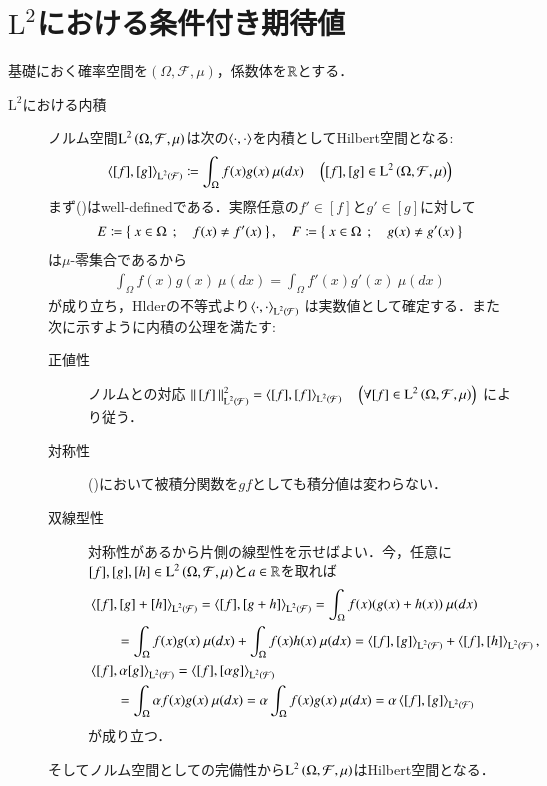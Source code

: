 \section{$\mathrm{L}^2$における条件付き期待値}
	基礎におく確率空間を$(\Omega,\mathcal{F},\mu)$，係数体を$\mathbb{R}$とする．
	
	\begin{description}
	\item[$\mathrm{L}^2$における内積]
		ノルム空間$\operatorname{L}^{2} \left(\Omega,\mathcal{F},\mu\right)$は次の$\inprod<\cdot,\cdot>$を内積としてHilbert空間となる:
		\begin{align}
			\inprod<[f],[g]>_{\Lp{2}{\mathcal{F}}} \coloneqq \int_{\Omega} f(x)g(x)\ \mu(dx) \quad \left( [f],[g] \in \Lp{2}{\Omega,\mathcal{F},\mu} \right)
			\label{eq:L2_inner_product}
		\end{align}
		まず()はwell-definedである．実際任意の$f' \in [f]$と$g' \in [g]$に対して
		\begin{align}
			E \coloneqq \left\{\ x \in \Omega\ \, ; \quad f(x) \neq f'(x)\ \right\}, \quad
			F \coloneqq \left\{\ x \in \Omega\ \, ; \quad g(x) \neq g'(x)\ \right\}
		\end{align}
		は$\mu$-零集合であるから
		\begin{align}
			\int_{\Omega} f(x)g(x)\ \mu(dx) = \int_{\Omega} f'(x)g'(x)\ \mu(dx)
		\end{align}
		が成り立ち，Hlderの不等式より$\inprod<\cdot,\cdot>_{\Lp{2}{\mathcal{F}}}$
		は実数値として確定する．また次に示すように内積の公理を満たす:
		\begin{description}
			\item[正値性] 
				ノルムとの対応
				$\Norm{[f]}{\Lp{2}{\mathcal{F}}}^2 = \inprod<[f],[f]>_{\Lp{2}{\mathcal{F}}} \quad \left(\forall [f] \in \Lp{2}{\Omega,\mathcal{F},\mu} \right)$
				により従う．
			\item[対称性] 
				()において被積分関数を$gf$としても積分値は変わらない．
			\item[双線型性] 
				対称性があるから片側の線型性を示せばよい．今，任意に$[f],[g],[h] \in \operatorname{L}^{2} \left(\Omega,\mathcal{F},\mu\right)$と$a \in \mathbb{R}$を取れば
				\begin{align}
					&\inprod<[f],[g] + [h]>_{\Lp{2}{\mathcal{F}}} 
					= \inprod<[f],[g + h]>_{\Lp{2}{\mathcal{F}}}
					= \int_{\Omega} f(x)(g(x) + h(x))\ \mu(dx) \\
					&\qquad= \int_{\Omega} f(x)g(x)\ \mu(dx) + \int_{\Omega} f(x)h(x)\ \mu(dx)
					= \inprod<[f],[g]>_{\Lp{2}{\mathcal{F}}} + \inprod<[f],[h]>_{\Lp{2}{\mathcal{F}}}, \\
					&\inprod<[f],\alpha [g]>_{\Lp{2}{\mathcal{F}}} 
						= \inprod<[f],[\alpha g]>_{\Lp{2}{\mathcal{F}}} \\
					&\qquad= \int_{\Omega} \alpha f(x)g(x)\ \mu(dx)
					= \alpha \int_{\Omega} f(x)g(x)\ \mu(dx)
					= \alpha \inprod<[f],[g]>_{\Lp{2}{\mathcal{F}}}
				\end{align}
				が成り立つ．
		\end{description}
		そしてノルム空間としての完備性から$\operatorname{L}^{2} \left(\Omega,\mathcal{F},\mu\right)$はHilbert空間となる．
	

\end{description}
